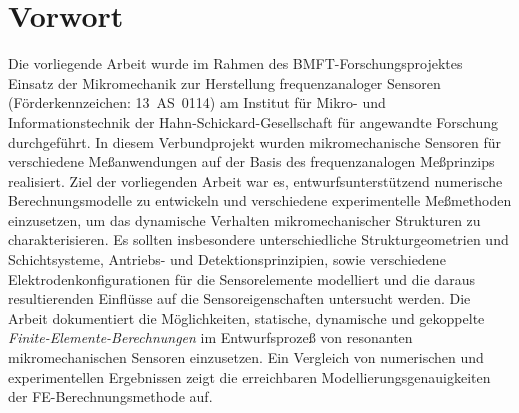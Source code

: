
\chapter*{Vorwort}



Die vorliegende Arbeit wurde im Rahmen des BMFT-Forschungsprojektes
\glqq Einsatz der Mikromechanik zur Herstellung frequenzanaloger
Sensoren\grqq \, (Förderkennzeichen: 13~AS~0114) am Institut für Mikro- und
Informationstechnik der Hahn-Schickard-Gesellschaft für angewandte
Forschung durchgeführt. In diesem Verbundprojekt wurden mikromechanische
Sensoren
für verschiedene Meßanwendungen auf der Basis des frequenz\-analogen
Meßprinzips realisiert. Ziel der vorliegenden Arbeit war es,
entwurfsunterstützend numerische Berechnungsmodelle zu
entwickeln und verschiedene experimentelle Meßmethoden einzusetzen,
um das dynamische Verhalten mikromechanischer Strukturen zu
charakterisieren.
Es sollten insbesondere unterschiedliche Strukturgeometrien und
Schichtsysteme, Antriebs- und Detektionsprinzipien, sowie
verschiedene Elektrodenkonfigurationen für die Sensorelemente modelliert
und die daraus
resultierenden Einflüsse auf die Sensoreigenschaften
untersucht werden.  Die Arbeit dokumentiert die Möglichkeiten, statische,
dynamische und gekoppelte {\em Finite-Elemente-Berechnungen} im
Entwurfsprozeß von
resonanten mikromechanischen Sensoren einzusetzen. Ein Vergleich von
numerischen und experimentellen Ergebnissen zeigt die erreichbaren
Modellierungsgenauigkeiten der FE-Berechnungsmethode auf.

